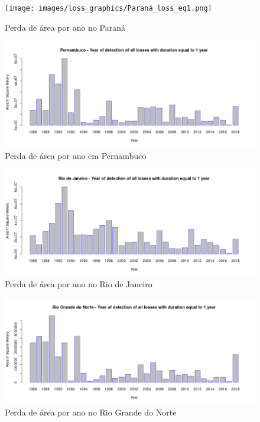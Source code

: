 \begin{figure}[H]
    \centering
    \texttt{[image: images/loss\_graphics/Paraná\_loss\_eq1.png]}
    \caption{Perda de área por ano no Paraná}
    \label{fig:loss_parana}
\end{figure}

\begin{figure}[H]
    \centering
    \includegraphics[scale=.5]{images/loss_graphics/Pernambuco_loss_eq1.png}
    \caption{Perda de área por ano em Pernambuco}
    \label{fig:loss_pernambuco}
\end{figure}

\begin{figure}[H]
    \centering
    \includegraphics[scale=.5]{images/loss_graphics/Rio de Janeiro_loss_eq1.png}
    \caption{Perda de área por ano no Rio de Janeiro}
    \label{fig:loss_rio_de_janeiro}
\end{figure}

\begin{figure}[H]
    \centering
    \includegraphics[scale=.5]{images/loss_graphics/Rio Grande do Norte_loss_eq1.png}
    \caption{Perda de área por ano no Rio Grande do Norte}
    \label{fig:loss_rio_grande_do_norte}
\end{figure}

